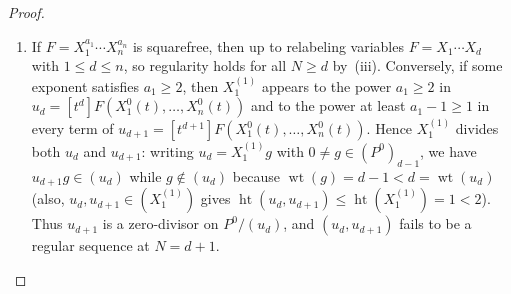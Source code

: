 \documentclass[a4paper, 12pt, reqno]{amsart}
\theoremstyle{remark}
\begin{document}
\begin{proof}
\begin{enumerate}
    Now assume $n = 2$.
    By~(ii), regularity for all $N \ge d$ forces $d \in \{1, 2\}$.
    If $d = 1$,
    $F$ is formally isomorphic to $X_1$ by the formal inverse function theorem,
    so regularity holds.
    Suppose $d = 2$.
    If the quadratic part of $F$ is non-degenerate and splits over $k$,
    then after a linear change of coordinates $F(X, Y) = X Y + G_{\ge 3}(X, Y)$ with $\operatorname{ord}_0(G_{\ge 3}) \ge 3$ (or $G_{\ge 3} = 0$).
    Setting $X_3 \coloneq X$ and $Y_3 \coloneq Y$,
    inductively for $m \ge 3$ we may write the degree-$m$ homogeneous part of $F - X_m Y_m$ as $X A_{m - 1} + Y B_{m - 1}$ with $A_{m - 1}, B_{m - 1} \in (X, Y)^{m - 1}$ and set $X_{m + 1} \coloneq X_m + B_{m - 1}$ and $Y_{m + 1} \coloneq Y_m + A_{m - 1}$,
    so that $F \equiv X_{m + 1} Y_{m + 1} \pmod{(X, Y)^{m + 1}}$;
    passing to the $(X, Y)$-adic limit yields formal coordinates $\hat{X}, \hat{Y} \in k[[X, Y]]$ with $F = \hat{X} \hat{Y}$,
    so regularity holds.
    If the quadratic part of $F$ is non-degenerate and non-split over $k$,
    it splits into two distinct linear factors over the algebraic closure $\bar{k}$,
    so regularity holds in $P^0 \otimes_k \bar{k}$ by the split case and descends to $P^0$ by faithful flatness of $P^0 \hookrightarrow P^0 \otimes_k \bar{k}$.
    Conversely,
    if $d = 2$ and the quadratic part of $F$ is degenerate (a repeated tangent line),
    then after a linear change of coordinates $F(X, Y) = c Y^2 + G_{\ge 3}(X, Y)$ with $c \in k^\times$ and $\operatorname{ord}_0(G_{\ge 3}) \ge 3$ (or $G_{\ge 3} = 0$).
    Modulo the height-$3$ prime ideal $\mathfrak{p} = (X^{(1)}, Y^{(1)}, Y^{(2)}) \subseteq P^0$,
    we have $\operatorname{ord}_t \overline{X^0}(t) \ge 2$ and $\operatorname{ord}_t \overline{Y^0}(t) \ge 3$,
    so $\operatorname{ord}_t(\overline{Y^0}(t)^2) \ge 6$ and $\operatorname{ord}_t(\overline{X^0}(t)^a \overline{Y^0}(t)^b) \ge 2a + 3b \ge 6$ for all $a + b \ge 3$;
    thus at $N = 5$ the four polynomials $u_2, u_3, u_4, u_5$ all lie in $\mathfrak{p}$,
    giving $\operatorname{ht}(u_2, u_3, u_4, u_5) \le 3 < 4$ and violating~\eqref{eq:reg-seq-height-criterion}.

  \item If $F = X_1^{a_1} \cdots X_n^{a_n}$ is squarefree,
    then up to relabeling variables $F = X_1 \cdots X_d$ with $1 \le d \le n$,
    so regularity holds for all $N \ge d$ by~(iii).
    Conversely,
    if some exponent satisfies $a_1 \ge 2$,
    then $X_1^{(1)}$ appears to the power $a_1 \ge 2$ in $u_d = [t^d]F(X^0_1(t), \dots, X^0_n(t))$ and to the power at least $a_1 - 1 \ge 1$ in every term of $u_{d + 1} = [t^{d + 1}]F(X^0_1(t), \dots, X^0_n(t))$.
    Hence $X_1^{(1)}$ divides both $u_d$ and $u_{d + 1}$:
    writing $u_d = X_1^{(1)} g$ with $0 \ne g \in (P^0)_{d - 1}$,
    we have $u_{d + 1} g \in (u_d)$ while $g \notin (u_d)$ because $\operatorname{wt}(g) = d - 1 < d = \operatorname{wt}(u_d)$
    (also, $u_d, u_{d + 1} \in (X_1^{(1)})$ gives $\operatorname{ht}(u_d, u_{d + 1}) \le \operatorname{ht}(X_1^{(1)}) = 1 < 2$).
    Thus $u_{d + 1}$ is a zero-divisor on $P^0 / (u_d)$,
    and $(u_d, u_{d + 1})$ fails to be a regular sequence at $N = d + 1$.\qedhere
  \end{enumerate}
\end{proof}
\end{document}
